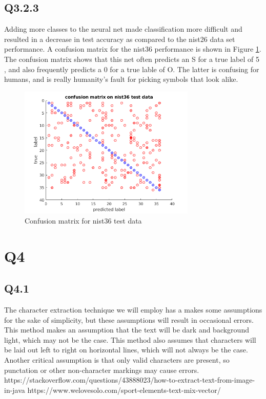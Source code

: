 \documentclass[12pt]{article}
\begin{document}
\subsection{Q3.2.3}
Adding more classes to the neural net made classification more difficult and resulted in a decrease in test accuracy as compared to the nist26 data set performance. A confusion matrix for the nist36 performance is shown in Figure \ref{fig:nist36confusion}. The confusion matrix shows that this net often predicts an S for a true label of 5 , and also frequently predicts a 0 for a true lable of O. The latter is confusing for humans, and is really humanity's fault for picking symbols that look alike.
\begin{figure}[H]
\centering
\includegraphics[page=1,width=0.75\textwidth]{q323confusion}
\caption{ Confusion matrix for nist36 test data } 
\label{fig:nist36confusion}
\end{figure}   

\section{Q4}
\subsection{Q4.1}
The character extraction technique we will employ has a makes some assumptions for the sake of simplicity, but these assumptions will result in occasional errors. This method makes an assumption that the text will be dark and background light, which may not be the case. This method also assumes that characters will be laid out left to right on horizontal lines, which will not always be the case. Another critical assumption is that only valid characters are present, so punctation or other non-character markings may cause errors.
https://stackoverflow.com/questions/43888023/how-to-extract-text-from-image-in-java
https://www.welovesolo.com/sport-elements-text-mix-vector/
\end{document}
